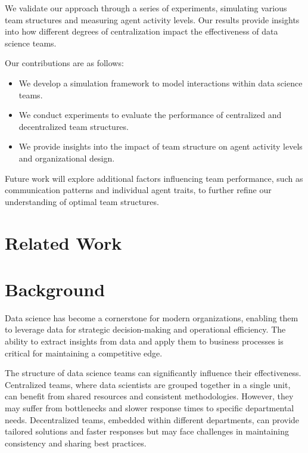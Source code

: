 \documentclass{article} %
\begin{document}
We validate our approach through a series of experiments, simulating various team structures and measuring agent activity levels. Our results provide insights into how different degrees of centralization impact the effectiveness of data science teams.

Our contributions are as follows:
\begin{itemize}
    \item We develop a simulation framework to model interactions within data science teams.
    \item We conduct experiments to evaluate the performance of centralized and decentralized team structures.
    \item We provide insights into the impact of team structure on agent activity levels and organizational design.
\end{itemize}

Future work will explore additional factors influencing team performance, such as communication patterns and individual agent traits, to further refine our understanding of optimal team structures.

\section{Related Work}
\label{sec:related}


\section{Background}
\label{sec:background}

Data science has become a cornerstone for modern organizations, enabling them to leverage data for strategic decision-making and operational efficiency. The ability to extract insights from data and apply them to business processes is critical for maintaining a competitive edge.

The structure of data science teams can significantly influence their effectiveness. Centralized teams, where data scientists are grouped together in a single unit, can benefit from shared resources and consistent methodologies. However, they may suffer from bottlenecks and slower response times to specific departmental needs. Decentralized teams, embedded within different departments, can provide tailored solutions and faster responses but may face challenges in maintaining consistency and sharing best practices.
\end{document}
